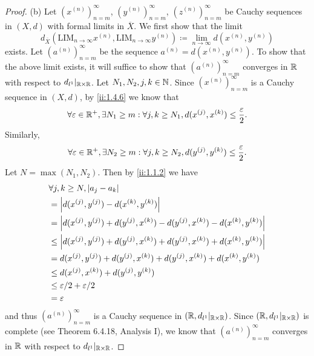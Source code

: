 \begin{proof}{(b)}
  Let \((x^{(n)})_{n = m}^\infty\), \((y^{(n)})_{n = m}^\infty\), \((z^{(n)})_{n = m}^\infty\) be Cauchy sequences in \((X, d)\) with formal limits in \(\overline{X}\).
  We first show that the limit
  \[
    d_{\overline{X}}(\text{LIM}_{n \to \infty} x^{(n)}, \text{LIM}_{n \to \infty} y^{(n)}) \coloneqq \lim_{n \to \infty} d(x^{(n)}, y^{(n)})
  \]
  exists.
  Let \((a^{(n)})_{n = m}^\infty\) be the sequence \(a^{(n)} = d(x^{(n)}, y^{(n)})\).
  To show that the above limit exists, it will suffice to show that \((a^{(n)})_{n = m}^\infty\) converges in \(\mathbb{R}\) with respect to \(d_{l^1}|_{\mathbb{R} \times \mathbb{R}}\).
  Let \(N_1, N_2, j, k \in \mathbb{N}\).
  Since \((x^{(n)})_{n = m}^\infty\) is a Cauchy sequence in \((X, d)\), by \cref{ii:1.4.6} we know that
  \[
    \forall \varepsilon \in \mathbb{R}^+, \exists N_1 \geq m : \forall j, k \geq N_1, d(x^{(j)}, x^{(k)}) \leq \dfrac{\varepsilon}{2}.
  \]
  Similarly,
  \[
    \forall \varepsilon \in \mathbb{R}^+, \exists N_2 \geq m : \forall j, k \geq N_2, d(y^{(j)}, y^{(k)}) \leq \dfrac{\varepsilon}{2}.
  \]
  Let \(N = \max(N_1, N_2)\).
  Then by \cref{ii:1.1.2} we have
  \begin{align*}
     & \forall j, k \geq N, \left\lvert a_j - a_k\right\rvert                                                             \\
     & = \left\lvert d(x^{(j)}, y^{(j)}) - d(x^{(k)}, y^{(k)})\right\rvert                                                \\
     & = \left\lvert d(x^{(j)}, y^{(j)}) + d(y^{(j)}, x^{(k)}) - d(y^{(j)}, x^{(k)}) - d(x^{(k)}, y^{(k)})\right\rvert    \\
     & \leq \left\lvert d(x^{(j)}, y^{(j)}) + d(y^{(j)}, x^{(k)}) + d(y^{(j)}, x^{(k)}) + d(x^{(k)}, y^{(k)})\right\rvert \\
     & = d(x^{(j)}, y^{(j)}) + d(y^{(j)}, x^{(k)}) + d(y^{(j)}, x^{(k)}) + d(x^{(k)}, y^{(k)})          \\
     & \leq d(x^{(j)}, x^{(k)}) + d(y^{(j)}, y^{(k)})                                                   \\
     & \leq \varepsilon / 2 + \varepsilon / 2                                                           \\
     & = \varepsilon
  \end{align*}
  and thus \((a^{(n)})_{n = m}^\infty\) is a Cauchy sequence in \((\mathbb{R}, d_{l^1}|_{\mathbb{R} \times \mathbb{R}})\).
  Since \((\mathbb{R}, d_{l^1}|_{\mathbb{R} \times \mathbb{R}})\) is complete (see Theorem 6.4.18, Analysis I), we know that \((a^{(n)})_{n = m}^\infty\) converges in \(\mathbb{R}\) with respect to \(d_{l^1}|_{\mathbb{R} \times \mathbb{R}}\).


\end{proof}
